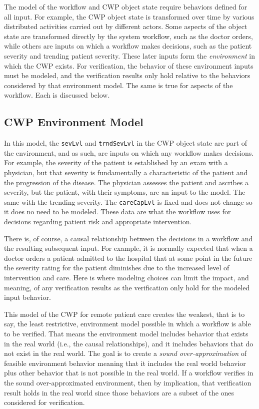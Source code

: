 The model of the workflow and CWP object state require behaviors defined for all input. For example, the CWP object state is transformed over time by various distributed activities carried out by different actors. Some aspects of the object state are transformed directly by the system workflow, such as the doctor orders, while others are inputs on which a workflow makes decisions, such as the patient severity and trending patient severity. These later inputs form the \emph{environment} in which the CWP exists. For verification, the behavior of these environment inputs must be modeled, and the verification results only hold relative to the behaviors considered by that environment model. The same is true for aspects of the workflow. Each is discussed below.

\subsection{CWP Environment Model}
In this model, the \texttt{sevLvl} and \texttt{trndSevLvl} in the CWP object state are part of the environment, and as such, are inputs on which any workflow makes decisions. For example, the severity of the patient is established by an exam with a physician, but that severity is fundamentally a characteristic of the patient and the progression of the disease. The physician assesses the patient and ascribes a severity, but the patient, with their symptoms, are an input to the model. The same with the trending severity. The \texttt{careCapLvl} is fixed and does not change so it does no need to be modeled. These data are what the workflow uses for decisions regarding patient risk and appropriate intervention. 

There is, of course, a causal relationship between the decisions in a workflow and the resulting subsequent input. For example, it is normally expected that when a doctor orders a patient admitted to the hospital that at some point in the future the severity rating for the patient diminishes due to the increased level of intervention and care. Here is where modeling choices can limit the impact, and meaning, of any verification results as the verification only hold for the modeled input behavior.

This model of the CWP for remote patient care creates the weakest, that is to say, the least restrictive, environment model possible in which a workflow is able to be verified. That means the environment model includes behavior that exists in the real world (i.e., the causal relationships), and it includes behaviors that do not exist in the real world. The goal is to create a \emph{sound over-approximation} of feasible environment behavior meaning that it includes the real world behavior plus other behavior that is not possible in the real world. If a workflow verifies in the sound over-approximated environment, then by implication, that verification result holds in the real world since those behaviors are a subset of the ones considered for verification. 

